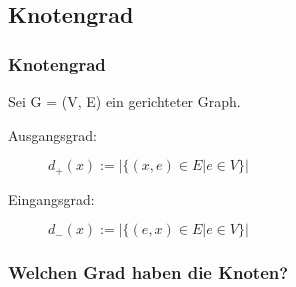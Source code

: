 \subsection{Knotengrad}
\begin{frame}
  \frametitle{Knotengrad}
  \begin{definition}
    Sei G = (V, E) ein gerichteter Graph.
    \begin{description}
      \item[Ausgangsgrad:] $d_+(x) := |\{(x, e) \in E | e \in V\}|$
      \item[Eingangsgrad:] $d_-(x) := |\{(e, x) \in E | e \in V\}|$
    \end{description}
  \end{definition}
\end{frame}
\begin{frame}[fragile]
  \frametitle{Welchen Grad haben die Knoten?}
    \begin{figure}
    \end{figure}
\end{frame}

